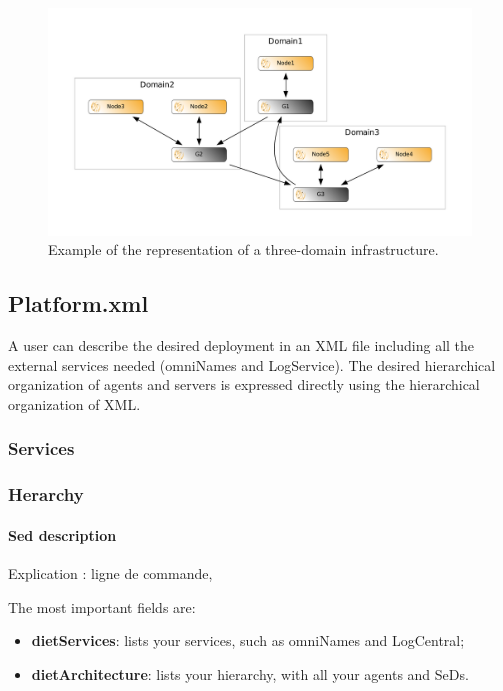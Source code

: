 \begin{figure}[h]
  \centering
  \includegraphics[width=15cm]{fig/godiet-infrastructure}
  \caption{Example of the representation of a three-domain infrastructure.\label{fig:GODIETInfrastructure}}
\end{figure}

\subsection{Platform.xml}
\label{GODIETPlatform}

A \godiet user can describe the desired deployment in an XML file including all the external services needed (\eg omniNames and LogService). The desired hierarchical organization of agents and servers is expressed directly using the hierarchical organization of XML. 

\subsubsection{Services}


\subsubsection{Herarchy}

\paragraph{Sed description}

Explication : ligne de commande, 



The most important fields are:
\begin{itemize}
\item \textbf{dietServices}: lists your \diet services, such as omniNames and LogCentral;
\item \textbf{dietArchitecture}: lists your \diet hierarchy, with all your agents and SeDs. 
\end{itemize}

